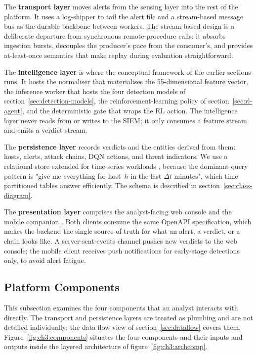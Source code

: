 The \textbf{transport layer} moves alerts from the sensing layer into
the rest of the platform. It uses a log-shipper to tail the alert file
\cite{filebeat2024} and a stream-based message bus \cite{redis2024} as
the durable backbone between workers. The stream-based design is a
deliberate departure from synchronous remote-procedure calls: it
absorbs ingestion bursts, decouples the producer's pace from the
consumer's, and provides at-least-once semantics that make replay
during evaluation straightforward.

The \textbf{intelligence layer} is where the conceptual framework of
the earlier sections runs. It hosts the normaliser that
materialises the 55-dimensional feature vector, the inference worker
that hosts the four detection models of section~\ref{sec:detection-models},
the reinforcement-learning policy of section~\ref{sec:rl-agent}, and
the deterministic gate that wraps the RL action. The intelligence
layer never reads from or writes to the SIEM; it only consumes a
feature stream and emits a verdict stream.

The \textbf{persistence layer} records verdicts and the entities derived
from them: hosts, alerts, attack chains, DQN actions, and threat
indicators. We use a relational store \cite{postgres2024} extended for
time-series workloads \cite{timescaledb2024}, because the dominant
query pattern is "give me everything for host~$h$ in the last
$\Delta t$ minutes", which time-partitioned tables answer
efficiently. The schema is described in section~\ref{sec:class-diagram}.

The \textbf{presentation layer} comprises the analyst-facing web
console \cite{nextjs2024} and the mobile companion \cite{expo2024}.
Both clients consume the same OpenAPI specification, which makes the
backend the single source of truth for what an alert, a verdict, or a
chain looks like. A server-sent-events channel pushes new verdicts to
the web console; the mobile client receives push notifications for
early-stage detections only, to avoid alert fatigue.

\subsection{Platform Components}
\label{sec:platform-components}

This subsection examines the four components that an analyst
interacts with directly. The transport and persistence layers are
treated as plumbing and are not detailed individually; the data-flow
view of section~\ref{sec:dataflow} covers them.
Figure~\ref{fig:ch3:components} situates the four components and
their inputs and outputs inside the layered architecture of
figure~\ref{fig:ch3:archcomp}.

